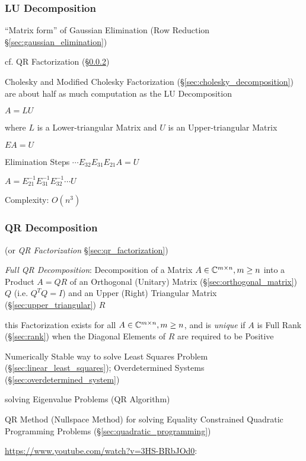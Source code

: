 \subsubsection{LU Decomposition}\label{sec:lu_decomposition}

``Matrix form'' of Gaussian Elimination (Row Reduction
\S\ref{sec:gaussian_elimination})

cf. QR Factorization (\S\ref{sec:qr_decomposition})

Cholesky and Modified Cholesky Factorization
(\S\ref{sec:cholesky_decomposition}) are about half as much computation as the
LU Decomposition

$A = LU$

where $L$ is a Lower-triangular Matrix and $U$ is an Upper-triangular Matrix

$EA = U$

Elimination Steps $\cdots E_{32}E_{31}E_{21}A = U$

$A = E_{21}^{-1}E_{31}^{-1}E_{32}^{-1}\cdots U$

Complexity: $O(n^3)$



\subsubsection{QR Decomposition}\label{sec:qr_decomposition}

(or \emph{QR Factorization} \S\ref{sec:qr_factorization})

\emph{Full QR Decomposition}: Decomposition of a Matrix $A \in \mathbb{C}^{m \times
  n}, m \geq n$ into a Product $A = QR$ of an Orthogonal (Unitary) Matrix
(\S\ref{sec:orthogonal_matrix}) $Q$ (i.e. $Q^TQ = I$) and an Upper (Right)
Triangular Matrix (\S\ref{sec:upper_triangular}) $R$

this Factorization exists for all $A \in \mathbb{C}^{m \times n}, m \geq n$, and is
\emph{unique} if $A$ is Full Rank (\S\ref{sec:rank}) when the Diagonal Elements
of $R$ are required to be Positive

Numerically Stable way to solve Least Squares Problem
(\S\ref{sec:linear_least_squares}); Overdetermined Systems
(\S\ref{sec:overdetermined_system})

solving Eigenvalue Problems (QR Algorithm)

\fist QR Method (Nullspace Method) for solving Equality Constrained Quadratic
Programming Problems (\S\ref{sec:quadratic_programming})


\url{https://www.youtube.com/watch?v=3HS-BRbJOd0}:

